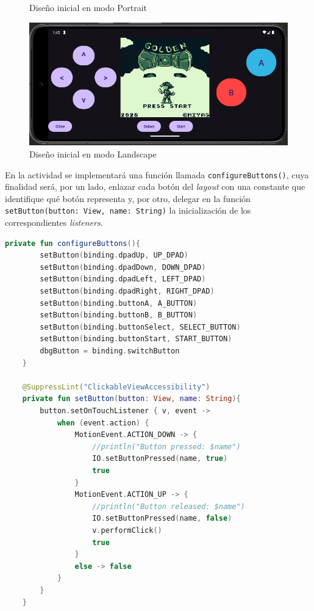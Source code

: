 \begin{figure}[H]
\begin{minipage}{0.30\textwidth}
        \caption{Diseño inicial en modo Portrait}
        \label{figure:design_1_portrait}
    \end{minipage}
    \hspace{0.05\textwidth}
    \begin{minipage}{0.50\textwidth}
        \centering
        \includegraphics[width=\textwidth]{include/images/design_1_2.png}
        \caption{Diseño inicial en modo Landscape}
        \label{figure:design_1_landscape}
    \end{minipage}
\end{figure}

En la actividad se implementará una función llamada \texttt{configureButtons()}, cuya finalidad será, por un lado, enlazar cada botón del \textit{layout} con una constante que identifique qué botón representa y, por otro, delegar en la función \texttt{setButton(button: View, name: String)} la inicialización de los correspondientes \textit{listeners}.

\begin{lstlisting}[language=Kotlin, caption={Enlace y Lógica de los Botones en la Actividad}, label={code:activityjoypad}]
    private fun configureButtons(){
        setButton(binding.dpadUp, UP_DPAD)
        setButton(binding.dpadDown, DOWN_DPAD)
        setButton(binding.dpadLeft, LEFT_DPAD)
        setButton(binding.dpadRight, RIGHT_DPAD)
        setButton(binding.buttonA, A_BUTTON)
        setButton(binding.buttonB, B_BUTTON)
        setButton(binding.buttonSelect, SELECT_BUTTON)
        setButton(binding.buttonStart, START_BUTTON)
        dbgButton = binding.switchButton
    }

    @SuppressLint("ClickableViewAccessibility")
    private fun setButton(button: View, name: String){
        button.setOnTouchListener { v, event ->
            when (event.action) {
                MotionEvent.ACTION_DOWN -> {
                    //println("Button pressed: $name")
                    IO.setButtonPressed(name, true)
                    true
                }
                MotionEvent.ACTION_UP -> {
                    //println("Button released: $name")
                    IO.setButtonPressed(name, false)
                    v.performClick()
                    true
                }
                else -> false
            }
        }
    }
    
\end{lstlisting}

